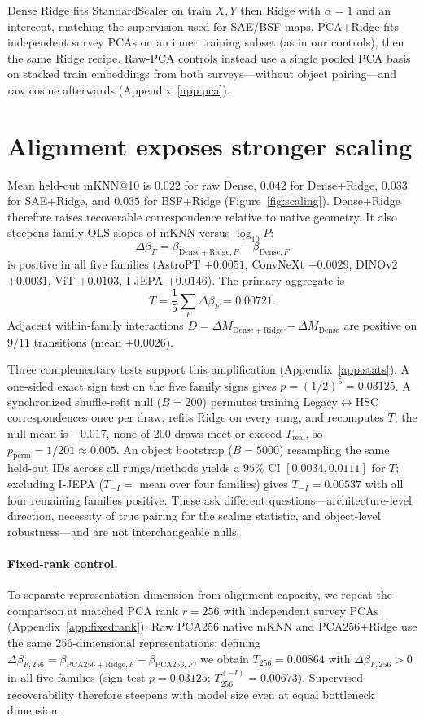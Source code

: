\documentclass{article}
\begin{document}
Dense Ridge fits \(\mathrm{StandardScaler}\) on train \(X,Y\) then Ridge with \(\alpha{=}1\) and an intercept, matching the supervision used for SAE/BSF maps.
PCA+Ridge fits independent survey PCAs on an inner training subset (as in our controls), then the same Ridge recipe.
Raw-PCA controls instead use a single pooled PCA basis on stacked train embeddings from both surveys---without object pairing---and raw cosine afterwards (Appendix~\ref{app:pca}).

\section{Alignment exposes stronger scaling}
\label{sec:scaling}

Mean held-out mKNN@10 is \(0.022\) for raw Dense, \(0.042\) for Dense+Ridge, \(0.033\) for SAE+Ridge, and \(0.035\) for BSF+Ridge (Figure~\ref{fig:scaling}).
Dense+Ridge therefore raises recoverable correspondence relative to native geometry.
It also steepens family OLS slopes of mKNN versus \(\log_{10}P\):
\[
\Delta\beta_F=\beta_{\mathrm{Dense+Ridge},F}-\beta_{\mathrm{Dense},F}
\]
is positive in all five families
(AstroPT \(+0.0051\), ConvNeXt \(+0.0029\), DINOv2 \(+0.0031\), ViT \(+0.0103\), I-JEPA \(+0.0146\)).
The primary aggregate is
\[
T=\frac15\sum_F\Delta\beta_F=0.00721.
\]
Adjacent within-family interactions \(D=\Delta M_{\mathrm{Dense+Ridge}}-\Delta M_{\mathrm{Dense}}\) are positive on \(9/11\) transitions (mean \(+0.0026\)).

Three complementary tests support this amplification (Appendix~\ref{app:stats}).
A one-sided exact sign test on the five family signs gives \(p=(1/2)^5=0.03125\).
A synchronized shuffle-refit null (\(B{=}200\)) permutes training Legacy\(\leftrightarrow\)HSC correspondences once per draw, refits Ridge on every rung, and recomputes \(T\): the null mean is \(-0.017\), none of \(200\) draws meet or exceed \(T_{\mathrm{real}}\), so \(p_{\mathrm{perm}}=1/201\approx0.005\).
An object bootstrap (\(B{=}5000\)) resampling the same held-out IDs across all rungs/methods yields a \(95\%\) CI \([0.0034,0.0111]\) for \(T\); excluding I-JEPA (\(T_{-I}=\) mean over four families) gives \(T_{-I}=0.00537\) with all four remaining families positive.
These ask different questions---architecture-level direction, necessity of true pairing for the scaling statistic, and object-level robustness---and are not interchangeable nulls.

\paragraph{Fixed-rank control.}
To separate representation dimension from alignment capacity, we repeat the comparison at matched PCA rank \(r{=}256\) with independent survey PCAs (Appendix~\ref{app:fixedrank}).
Raw PCA256 native mKNN and PCA256+Ridge use the same 256-dimensional representations; defining
\(\Delta\beta_{F,256}=\beta_{\mathrm{PCA256+Ridge},F}-\beta_{\mathrm{PCA256},F}\),
we obtain \(T_{256}=0.00864\) with \(\Delta\beta_{F,256}>0\) in all five families (sign test \(p{=}0.03125\); \(T_{256}^{(-I)}=0.00673\)).
Supervised recoverability therefore steepens with model size even at equal bottleneck dimension.
\end{document}
